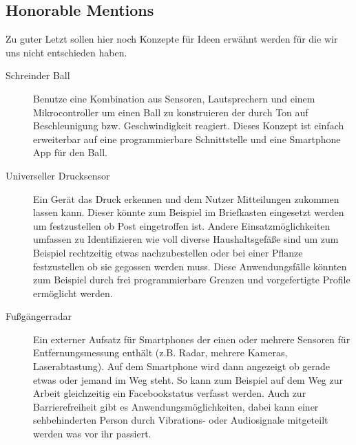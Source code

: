 \subsection{\glqq Honorable Mentions\grqq}
Zu guter Letzt sollen hier noch Konzepte für Ideen erwähnt werden für die wir uns nicht entschieden haben.
\begin{description}
	\item[Schreinder Ball] Benutze eine Kombination aus Sensoren, Lautsprechern und einem Mikrocontroller um einen Ball zu konstruieren der durch Ton auf Beschleunigung bzw. Geschwindigkeit reagiert. Dieses Konzept ist einfach erweiterbar auf eine programmierbare Schnittstelle und eine Smartphone App für den Ball.
	
	\item[Universeller Drucksensor] Ein Gerät das Druck erkennen und dem Nutzer Mitteilungen zukommen lassen kann. Dieser könnte zum Beispiel im Briefkasten eingesetzt werden um festzustellen ob Post eingetroffen ist. Andere Einsatzmöglichkeiten umfassen zu Identifizieren wie voll diverse Haushaltsgefäße sind um zum Beispiel rechtzeitig etwas nachzubestellen oder bei einer Pflanze festzustellen ob sie gegossen werden muss. Diese Anwendungsfälle könnten zum Beispiel durch frei programmierbare Grenzen und vorgefertigte Profile ermöglicht werden.
	
	\item[Fußgängerradar] Ein externer Aufsatz für Smartphones der einen oder mehrere Sensoren für Entfernungsmessung enthält (z.B. Radar, mehrere Kameras, Laserabtastung). Auf dem Smartphone wird dann angezeigt ob gerade etwas oder jemand im Weg steht. So kann zum Beispiel auf dem Weg zur Arbeit gleichzeitig ein Facebookstatus verfasst werden. Auch zur Barrierefreiheit gibt es Anwendungsmöglichkeiten, dabei kann einer sehbehinderten Person durch Vibrations- oder Audiosignale mitgeteilt werden was vor ihr passiert.
\end{description}